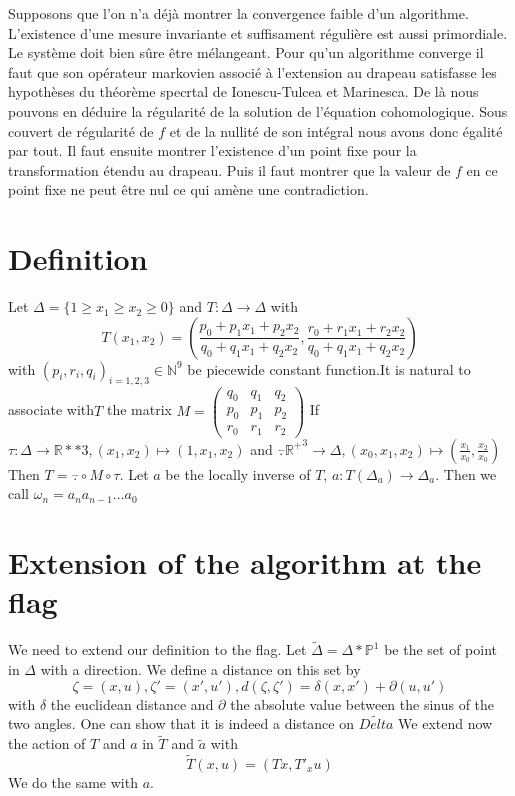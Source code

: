 \documentclass[12pt]{article}
\theoremstyle{plain}%
\theoremstyle{definition}
\theoremstyle{remark}
\begin{document}
Supposons que l'on n'a déjà montrer la convergence faible d'un algorithme.
L'existence d'une mesure invariante et suffisament régulière est aussi primordiale.
Le système doit bien sûre être mélangeant.
Pour qu'un algorithme converge il faut que son opérateur markovien associé à l'extension au drapeau satisfasse les hypothèses du théorème specrtal de Ionescu-Tulcea et Marinesca.
De là nous pouvons en déduire la régularité de la solution de l'équation cohomologique.
Sous couvert de régularité de $f$ et de la nullité de son intégral nous avons donc égalité par tout. Il faut ensuite montrer l'existence d'un point fixe pour la transformation étendu au drapeau.
Puis il faut montrer que la valeur de $f$ en ce point fixe ne peut être nul ce qui amène une contradiction.
\section{Definition}
Let $\Delta=\{ 1 \geq x_1 \geq x_2 \geq 0 \}$ and $T:\Delta \to \Delta$ with \[ T(x_1,x_2)=(\frac{p_0+p_1 x_1+p_2 x_2}{q_0+q_1 x_1 +q_2 x_2},\frac{r_0+r_1 x_1+r_2 x_2}{q_0+q_1 x_1 +q_2 x_2}) \] with $(p_i,r_i,q_i)_{i=1,2,3}\in \mathbb{N}^9$ be piecewide constant function.It is natural to associate with$T $ the matrix $M=\begin{pmatrix} q_0 & q_1 & q_2 \\ p_0 & p_1 & p_2 \\ r_0 & r_1 & r_2 \end{pmatrix}$
If $\tau: \Delta \to \mathbb{R}**3, (x_1,x_2) \mapsto (1,x_1,x_2)$ and $\overset{-}{.} \mathbb{R^+}^3 \to \Delta,(x_0,x_1,x_2) \mapsto (\frac{x_1}{x_0},\frac{x_2}{x_0})$
Then $T=\overset{-}{.} \circ M \circ \tau$\newline.
Let $a$ be the locally inverse of $T$, $a:T(\Delta_a) \to \Delta_a$. Then we call $\omega_n=a_n a_{n-1} ... a_0$
\section{Extension of the algorithm at the flag}
We need to extend our definition to the flag. Let $\tilde{\Delta}=\Delta*\mathbb{P}^1$ be the set of point in $\Delta$ with a direction. We define a distance on this set by \[
\zeta=(x,u),\zeta'=(x',u'),d(\zeta,\zeta')=\delta(x,x')+\partial (u,u')
\]
with $\delta$ the euclidean distance and $\partial$ the absolute value between the sinus of the two angles.
One can show that it is indeed a distance on $\tilde{Delta}$\newline
We extend now the action of $T$ and $a$ in $\tilde{T}$ and $\tilde{a}$ with\[
\tilde{T}(x,u)=(Tx,T'_x u)
\]
We do the same with $a$.
\end{document}
